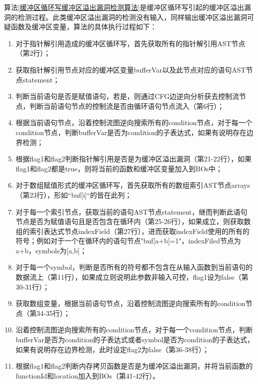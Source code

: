 {算法\ref{缓冲区循环写缓冲区溢出漏洞检测算法}是缓冲区循环写引起的缓冲区溢出漏洞的检测过程。此类缓冲区溢出漏洞的检测没有输入，同样输出缓冲区溢出漏洞可疑函数及缓冲区变量，算法的具体执行过程如下：
\begin{enumerate}[(1)]
\item 对于指针解引用造成的缓冲区循环写，首先获取所有的指针解引用AST节点（第2行）；
\item 获取指针解引用节点对应的缓冲区变量bufferVar以及此节点对应的语句AST节点statement；
\item 判断当前语句是否是赋值语句，若是，则通过CFG边逆向分析获去控制流节点，判断当前语句节点的控制流是否由循环语句节点流入（第6行）；
\item 根据当前语句节点，沿着控制流图逆向搜索所有的condition节点，对于每一个condition节点，判断bufferVar是否为condition的子表达式，如果有说明存在边界检测；
\item 根据flag1和flag2判断指针解引用是否是为缓冲区溢出漏洞（第21-22行），如果flag1和flag2都是true，则将当前的函数和缓冲区变量加入到BOs中；
\item 对于数组赋值形式的缓冲区循环写，首先获取所有的数组索引AST节点arrays（第23行），形如“buf[i]“的皆在此列；
\item 对于每一个索引节点，获取当前的语句AST节点statement，继而判断此语句节点是否为赋值语句且是否包含在循环内（第25-26行），如果成立，则获取数组的索引表达式节点indexField（第27行），进而获取indexField使用的所有的符号；例如对于一个在循环内的语句节点"buf[a+b]=1"，indexFiled节点为a+b，symbols为[a,b]；
\item 对于每一个symbol，判断是否所有的符号都不包含在从输入函数到当前语句的数据流上（第11行），如果成立则说明此参数非输入可控，flag1设为false（第30-31行）；
\item 获取数组变量，根据当前语句节点，沿着控制流图逆向搜索所有的condition节点（第34-35行）；
\item 沿着控制流图逆向搜索所有的condition节点，对于每一个condition节点，判断bufferVar是否为condition的子表达式或者symbol是否为condition的子表达式，如果有说明存在边界检测，此时设定flag2为false（第36-38行）；
\item 根据flag1和flag2判断内存拷贝函数是否是为缓冲区溢出漏洞，并将当前函数的functionId和location加入到BOs（第41-42行）。
\end{enumerate}

\begin{breakablealgorithm}
	\renewcommand{\algorithmicrequire}{\textbf{Input:}}
	\renewcommand{\algorithmicensure}{\textbf{Output:}}
	

\end{breakablealgorithm}}

